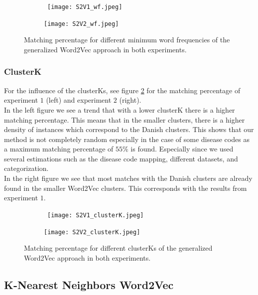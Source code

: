 \begin{figure}[!htb]
	\centering
	\begin{subfigure}[b]{.49\textwidth}\
		\texttt{[image: S2V1\_wf.jpeg]}
	\end{subfigure}
	\begin{subfigure}[b]{.49\textwidth}
		\texttt{[image: S2V2\_wf.jpeg]}
	\end{subfigure}
	\caption{Matching percentage for different minimum word frequencies of the generalized Word2Vec approach in both experiments.}
	\label{fig:s2v_wf}
\end{figure}



\subsubsection{ClusterK}

For the influence of the clusterKs, see figure \ref{fig:s2v_clusterK} for the matching percentage of experiment $1$ (left) and experiment $2$ (right). \\

In the left figure we see a trend that with a lower clusterK there is a higher matching percentage. This means that in the smaller clusters, there is a higher density of instances which correspond to the Danish clusters. This shows that our method is not completely random especially in the case of some disease codes as a maximum matching percentage of $55$\% is found. Especially since we used several estimations such as the disease code mapping, different datasets, and categorization. \\
In the right figure we see that most matches with the Danish clusters are already found in the smaller Word2Vec clusters. This corresponds with the results from experiment $1$.

\begin{figure}[!htb]
	\centering
	\begin{subfigure}[b]{.49\textwidth}\
		\texttt{[image: S2V1\_clusterK.jpeg]}
	\end{subfigure}
	\begin{subfigure}[b]{.49\textwidth}
		\texttt{[image: S2V2\_clusterK.jpeg]}
	\end{subfigure}
	\caption{Matching percentage for different clusterKs of the generalized Word2Vec 	approach in both experiments.}
	\label{fig:s2v_clusterK}
\end{figure}


\subsection{K-Nearest Neighbors Word2Vec}

